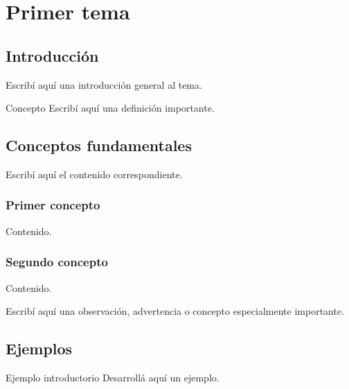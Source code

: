 \documentclass[12pt,oneside]{book}
\begin{document}
\tableofcontents

\clearpage


\chapter{Primer tema}

\section{Introducción}

Escribí aquí una introducción general al tema.

\begin{definition}{Concepto}
Escribí aquí una definición importante.
\end{definition}

\section{Conceptos fundamentales}

Escribí aquí el contenido correspondiente.

\subsection{Primer concepto}

Contenido.

\subsection{Segundo concepto}

Contenido.

\begin{important}
Escribí aquí una observación, advertencia o concepto
especialmente importante.
\end{important}

\section{Ejemplos}

\begin{example}{Ejemplo introductorio}
Desarrollá aquí un ejemplo.
\end{example}

\end{document}
